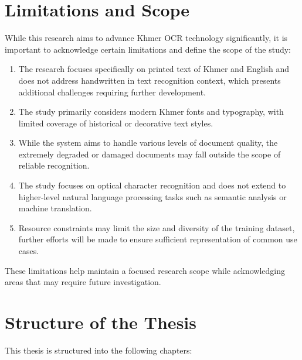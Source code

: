 \section{Limitations and Scope}
\label{sec:limitations}

While this research aims to advance Khmer OCR technology significantly, it is important to acknowledge certain limitations and define the scope of the study:

\begin{enumerate}
    \item The research focuses specifically on printed text of Khmer and English and does not address handwritten in text recognition context, which presents additional challenges requiring further development.
    
    \item The study primarily considers modern Khmer fonts and typography, with limited coverage of historical or decorative text styles.
    
    \item While the system aims to handle various levels of document quality, the extremely degraded or damaged documents may fall outside the scope of reliable recognition.
    
    \item The study focuses on optical character recognition and does not extend to higher-level natural language processing tasks such as semantic analysis or machine translation.
    
    \item Resource constraints may limit the size and diversity of the training dataset, further efforts will be made to ensure sufficient representation of common use cases.
\end{enumerate}

These limitations help maintain a focused research scope while acknowledging areas that may require future investigation.

\section{Structure of the Thesis}
\label{sec:structure}

This thesis is structured into the following chapters:

